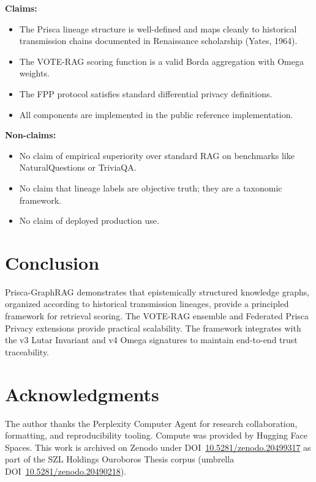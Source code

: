 \documentclass[11pt]{article}
\theoremstyle{plain}
\begin{document}
\textbf{Claims:}
\begin{itemize}
  \item The Prisca lineage structure is well-defined and maps cleanly to historical transmission chains documented in Renaissance scholarship (Yates, 1964).
  \item The VOTE-RAG scoring function is a valid Borda aggregation with Omega weights.
  \item The FPP protocol satisfies standard differential privacy definitions.
  \item All components are implemented in the public reference implementation.
\end{itemize}

\textbf{Non-claims:}
\begin{itemize}
  \item No claim of empirical superiority over standard RAG on benchmarks like NaturalQuestions or TriviaQA.
  \item No claim that lineage labels are objective truth; they are a taxonomic framework.
  \item No claim of deployed production use.
\end{itemize}


\section{Conclusion}

Prisca-GraphRAG demonstrates that epistemically structured knowledge graphs, organized according to historical transmission lineages, provide a principled framework for retrieval scoring. The VOTE-RAG ensemble and Federated Prisca Privacy extensions provide practical scalability. The framework integrates with the v3 Lutar Invariant and v4 Omega signatures to maintain end-to-end trust traceability.




\section*{Acknowledgments}
The author thanks the Perplexity Computer Agent for research collaboration, formatting, and
reproducibility tooling. Compute was provided by Hugging Face Spaces. This work is archived on
Zenodo under DOI~\href{https://doi.org/10.5281/zenodo.20499317}{10.5281/zenodo.20499317} as part of the SZL Holdings Ouroboros Thesis
corpus (umbrella DOI~\href{https://doi.org/10.5281/zenodo.20490218}{10.5281/zenodo.20490218}).

\nocite{02ref1,02ref2,02ref3,02ref4,02ref5,02ref6,02ref7,02ref8,02ref9}


\end{document}
